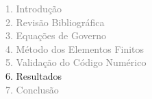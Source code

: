 
\begin{frame}
  \vspace{-1cm}
  \textcolor{gray}{1. Introdução}\\[0.1cm]
  \textcolor{gray}{2. Revisão Bibliográfica}\\[0.1cm]
  \textcolor{gray}{3. Equações de Governo}\\[0.1cm]
  \textcolor{gray}{4. Método dos Elementos Finitos}\\[0.1cm]
  \textcolor{gray}{5. Validação do Código Numérico}\\[0.1cm]
  6. Resultados\\[0.1cm]
  \textcolor{gray}{7. Conclusão}
\end{frame}



